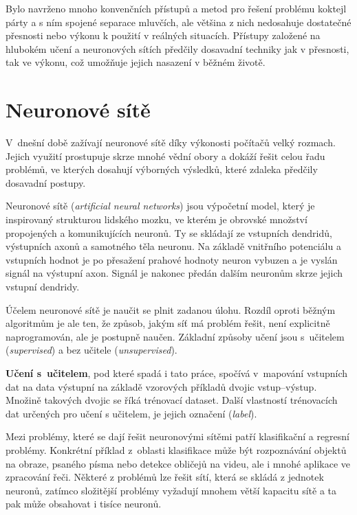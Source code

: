 Bylo navrženo mnoho konvenčních přístupů a metod pro řešení problému koktejl párty a s ním spojené separace mluvčích, ale většina z nich nedosahuje dostatečné přesnosti nebo výkonu k použití v reálných situacích. Přístupy založené na hlubokém učení a neuronových sítích předčily dosavadní techniky jak v přesnosti, tak ve výkonu, což umožňuje jejich nasazení v běžném životě.


\chapter{Neuronové sítě}
\label{neuronovky}
V~dnešní době zažívají neuronové sítě díky výkonosti počítačů velký rozmach. Jejich využití prostupuje skrze mnohé vědní obory a dokáží řešit celou řadu problémů, ve kterých dosahují výborných výsledků, které zdaleka předčily dosavadní postupy. 

Neuronové sítě (\textit{artificial neural networks}) jsou výpočetní model, který je inspirovaný strukturou lidského mozku, ve kterém je obrovské množství propojených a komunikujících neuronů. Ty se skládají ze vstupních dendridů, výstupních axonů a samotného těla neuronu. Na základě vnitřního potenciálu a vstupních hodnot je po přesažení prahové hodnoty neuron vybuzen a je vyslán signál na výstupní axon. Signál je nakonec předán dalším neuronům skrze jejich vstupní dendridy\cite[p.~65--66]{mitdeeplearning_small}.

Účelem neuronové sítě je naučit se plnit zadanou úlohu. Rozdíl oproti běžným algoritmům je ale ten, že způsob, jakým síť má problém řešit, není explicitně naprogramován, ale je postupně naučen. Základní způsoby učení jsou s~učitelem (\textit{supervised}) a bez učitele (\textit{unsupervised}). 

\textbf{Učení s~učitelem}, pod které spadá i tato práce, spočívá v~mapování vstupních dat na data výstupní na základě vzorových příkladů dvojic vstup--výstup. Množině takových dvojic se říká trénovací dataset. Další vlastností trénovacích dat určených pro učení s učitelem, je jejich označení (\textit{label}).

Mezi problémy, které se dají řešit neuronovými sítěmi patří klasifikační a regresní problémy. Konkrétní příklad z~oblasti klasifikace může být rozpoznávání objektů na obraze, psaného písma nebo detekce obličejů na videu, ale i mnohé aplikace ve zpracování řeči. Některé z problémů lze řešit sítí, která se skládá z jednotek neuronů, zatímco složitější problémy vyžadují mnohem větší kapacitu sítě a ta pak může obsahovat i tisíce neuronů.

